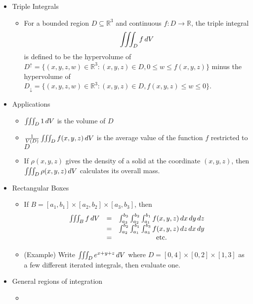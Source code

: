 \documentclass[11pt]{article}
\begin{document}
\begin{itemize}
  \item Triple Integrals
    \begin{itemize}
      \item
      For a bounded region \(D\subseteq\mathbb R^3\) and continuous
      \(f:D\to\mathbb R\), the triple integral
        \[
          \iiint_D f\,d V
        \]
      is defined to be the hypervolume of
      \(D^\uparrow=\{(x,y,z,w)\in\mathbb R^3:(x,y,z)\in D,0\leq w\leq f(x,y,z)\}\)
      minus the hypervolume of
      \(D_\downarrow=\{(x,y,z,w)\in\mathbb R^3:(x,y,z)\in D,f(x,y,z)\leq w\leq 0\}\).
    \end{itemize}
  \item Applications
    \begin{itemize}
      \item \(\iiint_D 1\,d V\) is the volume of \(D\)
      \item \(\frac{1}{V(D)}\iiint_D f(x,y,z)\,d V\) is the average value
            of the function \(f\) restricted to \(D\)
      \item If \(\rho(x,y,z)\) gives the density of a solid at the coordinate
            \((x,y,z)\), then \(\iiint_D \rho(x,y,z)\,d V\) calculates its
            overall mass.
    \end{itemize}
  \item Rectangular Boxes
    \begin{itemize}
      \item
      If \(B=[a_1,b_1]\times[a_2,b_2]\times[a_3,b_3]\), then
        \[
          \begin{matrix}
            \iiint_B f\,d V
              & = &
            \int_{a_3}^{b_3}\int_{a_2}^{b_2}\int_{a_1}^{b_1}
            f(x,y,z) \,d x\,d y\,d z
              \\ & = &
            \int_{a_2}^{b_2}\int_{a_1}^{b_1}\int_{a_3}^{b_3}
            f(x,y,z) \,d z\,d x\,d y
              \\ & = &
            \text{etc.}
          \end{matrix}
        \]
      \item
      (Example)
      Write \(\iiint_D e^{x+y+z}\,d V\) where
      \(D=[0,4]\times[0,2]\times[1,3]\) as a few different iterated integrals,
      then evaluate one.
    \end{itemize}
  \item General regions of integration
    \begin{itemize}
      \item

\end{itemize}
\end{itemize}
\end{document}
